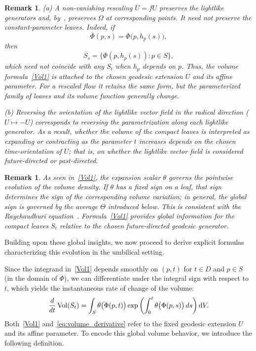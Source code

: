 \documentclass[11pt]{article}
\numberwithin{equation}{section}
\newtheorem{remark}[theorem]{Remark}
\begin{document}
\begin{remark}\label{remark_reversing}\normalfont
	(a) A non-vanishing rescaling \(\overline U=fU\) preserves the lightlike generators and, by~, preserves \(\Omega\) at corresponding points. It need not preserve the constant-parameter leaves. Indeed, if
	\[
		\overline\Phi(p,s)=\Phi\bigl(p,h_p(s)\bigr),
	\]
	then
	\[
		\overline S_s=\{\Phi(p,h_p(s)):p\in S\},
	\]
	which need not coincide with any \(S_t\) when \(h_p\) depends on \(p\). Thus, the volume formula~\eqref{Vol1} is attached to the chosen geodesic extension \(U\) and its affine parameter. For a rescaled flow it retains the same form, but the parameterized family of leaves and its volume function generally change.
	
	(b) Reversing the orientation of the lightlike vector field in the radical direction (\(U \mapsto -U\)) corresponds to reversing the parametrization along each lightlike generator. As a result, whether the volume of the compact leaves is interpreted as expanding or contracting as the parameter \(t\) increases depends on the chosen time-orientation of \(U\); that is, on whether the lightlike vector field is considered future-directed or past-directed.
\end{remark}

\begin{remark} \label{remark:raychaudhuri_connection} \normalfont
	As seen in~\eqref{Vol1}, the expansion scalar $\theta$ governs the pointwise evolution of the volume density. If $\theta$ has a fixed sign on a leaf, that sign determines the sign of the corresponding volume variation; in general, the global sign is governed by the average $\Theta$ introduced below. This is consistent with the Raychaudhuri equation~\cite{beem, HawkingEllis, SanchWu}. Formula~\eqref{Vol1} provides global information for the compact leaves $S_t$ relative to the chosen future-directed geodesic generator.
\end{remark}
	

	
	Building upon these global insights, we now proceed to derive explicit formulas characterizing this evolution in the umbilical setting.
	
Since the integrand in~\eqref{Vol1} depends smoothly on $(p, t)$ for $t \in D$ and $p \in S$ (in the domain of $\Phi$), we can differentiate under the integral sign with respect to $t$, which yields the instantaneous rate of change of the volume:
\begin{equation}\label{eq:volume_derivative}
	\frac{d}{dt} \operatorname{Vol}(S_t) = \int_S \theta\bigl(\Phi(p, t)\bigr) \exp\left( \int_0^t \theta\bigl(\Phi(p, s)\bigr)\, ds \right) {\rm d}V.
\end{equation}
Both~\eqref{Vol1} and~\eqref{eq:volume_derivative} refer to the fixed geodesic extension $U$ and its affine parameter. To encode this global volume behavior, we introduce the following definition.
	
\end{document}
